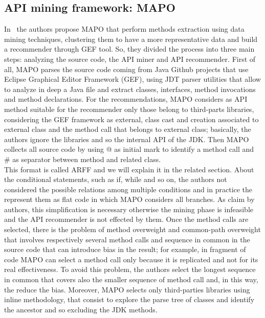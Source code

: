 \subsection{API mining framework: MAPO}
In~\cite{zhong_mapo:_2009} the authors propose MAPO that perform methods extraction using data mining techniques, clustering them to have a more representative data and build a recommender through GEF tool. So, they divided the process into three main steps: analyzing the source code, the API miner and API recommender. First of all, MAPO parses the source code coming from Java Github projects that use Eclipse Graphical Editor Framework (GEF), using JDT parser utilities that allow to analyze in deep a Java file and extract classes, interfaces, method invocations and method declarations. For the recommendations, MAPO considers as API method suitable for the recommender only those belong to third-parts libraries, considering the GEF framework as external, class cast and creation associated to external class and the method call that belongs to external class; basically, the authors ignore the libraries and so the internal API of the JDK. Then MAPO collects all source code by using @ as initial mark to identify a method call and \# as separator between method and related class. \\
This format is called ARFF and we will explain it in the related section. About the conditional statements, such as if, while and so on, the authors not considered the possible relations among multiple conditions and in practice the represent them as flat code in which MAPO considers all branches. As claim by authors, this simplification is necessary otherwise the mining phase is infeasible and the API recommender is not effected by them. Once the method calls are selected, there is the problem of method overweight and common-path overweight that involves respectively several method calls and sequence in common in the source code that can introduce bias in the result; for example, in fragment of code MAPO can select a method call only because it is replicated and not for its real effectiveness. To avoid this problem, the authors select the longest sequence in common that covers also the smaller sequence of method call and, in this way, the reduce the bias. Moreover, MAPO selects only third-parties libraries using inline methodology, that consist to explore the parse tree of classes and identify the ancestor and so excluding the JDK methods. \newline
